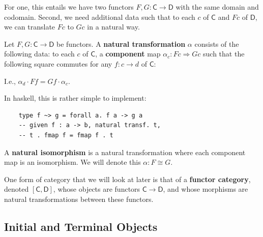 \documentclass[tikz]{beamer}
\newcommand{\cat}[1]{\bm{ \mathsf{#1} }}
\newcommand{\cc}{\cat{C}}
\newcommand{\dd}{\cat{D}}
\theoremstyle{definition}
\begin{document}
\frame
{
	For one, this entails we have two functors $F, G : \cc \to \dd$ with the same domain and codomain. Second, we need additional data such that to each $c$ of $\cc$ and $Fc$ of $\dd$, we can translate $Fc$ to $Gc$ in a natural way. 
}


\begin{frame}[fragile]

	\begin{definition}
		Let $F,G : \cc \to \dd$ be functors. A \textbf{natural transformation} $\alpha$ consists of the following data: to each $c$ of $\cc$, a \textbf{component} map $\alpha_c : Fc \Rightarrow Gc$ such that the following square commutes for any $f : c \to d$ of $\cc$: 
		
		\begin{center}
		\end{center}
	\end{definition}
\end{frame}

\frame
{
	I.e., $\alpha_d \cdot Ff = Gf \cdot \alpha_c$.
}

\begin{frame}[fragile]

	In haskell, this is rather simple to implement: 
	
	\begin{verbatim}
	type f ~> g = forall a. f a -> g a
	-- given f : a -> b, natural transf. t,
	-- t . fmap f = fmap f . t 
	\end{verbatim}
\end{frame}

\frame
{
	A \textbf{natural isomorphism} is a natural transformation where each component map is an isomorphism. We will denote this $\alpha : F \cong G$. 
	
}

\frame
{
	One form of category that we will look at later is that of a \textbf{functor category}, denoted $[\cc, \dd]$, whose objects are functors $\cc \to \dd$, and whose morphisms are natural transformations between these functors. 
}

\subsection{Initial and Terminal Objects}
\end{document}
